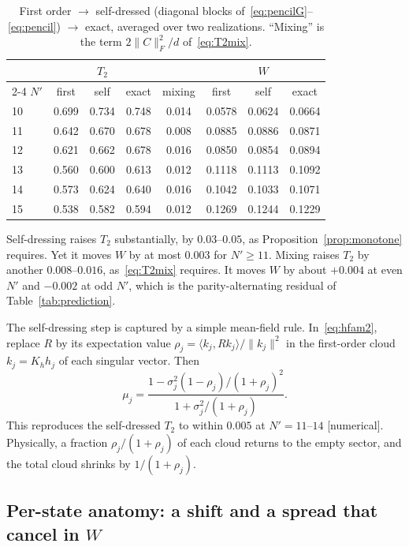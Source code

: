 \documentclass[11pt]{article}
\newcommand{\Np}{N'}
\newcommand{\ip}[2]{\langle #1,#2\rangle}
\newcommand{\Kh}{K_h}
\newcommand{\tagbox}[2]{\textsf{\small\color{#1}[#2]}}
\newcommand{\NUM}{\tagbox{cnum}{numerical}}
\theoremstyle{plain}
\theoremstyle{remark}
\numberwithin{equation}{section}
\begin{document}
\begin{table}[ht]
\centering\small
\caption{First order $\to$ self-dressed (diagonal blocks of~\eqref{eq:pencilG}--\eqref{eq:pencil}) $\to$ exact, averaged over two
realizations. ``Mixing'' is the term $2\|C\|_F^2/d$ of~\eqref{eq:T2mix}.}
\label{tab:blocks}
\begin{tabular}{lccccccc}\toprule
& \multicolumn{3}{c}{$T_2$} & & \multicolumn{3}{c}{$W$}\\\cmidrule{2-4}\cmidrule{6-8}
$\Np$ & first & self & exact & mixing & first & self & exact\\\midrule
10 & 0.699 & 0.734 & 0.748 & 0.014 & 0.0578 & 0.0624 & 0.0664\\
11 & 0.642 & 0.670 & 0.678 & 0.008 & 0.0885 & 0.0886 & 0.0871\\
12 & 0.621 & 0.662 & 0.678 & 0.016 & 0.0850 & 0.0854 & 0.0894\\
13 & 0.560 & 0.600 & 0.613 & 0.012 & 0.1118 & 0.1113 & 0.1092\\
14 & 0.573 & 0.624 & 0.640 & 0.016 & 0.1042 & 0.1033 & 0.1071\\
15 & 0.538 & 0.582 & 0.594 & 0.012 & 0.1269 & 0.1244 & 0.1229\\\bottomrule
\end{tabular}
\end{table}

Self-dressing raises $T_2$ substantially, by $0.03$--$0.05$, as Proposition~\ref{prop:monotone} requires. Yet it moves $W$
by at most $0.003$ for $\Np\ge11$. Mixing raises $T_2$ by another $0.008$--$0.016$, as~\eqref{eq:T2mix} requires. It
moves $W$ by about $+0.004$ at even $\Np$ and $-0.002$ at odd $\Np$, which is the parity-alternating residual of
Table~\ref{tab:prediction}.

The self-dressing step is captured by a simple mean-field rule. In~\eqref{eq:hfam2}, replace $R$ by its expectation
value $\rho_j=\ip{k_j}{Rk_j}/\|k_j\|^2$ in the first-order cloud $k_j=\Kh h_j$ of each singular vector. Then
\begin{equation}\label{eq:meanfield}
\mu_j=\frac{1-\sigma_j^2(1-\rho_j)/(1+\rho_j)^2}{1+\sigma_j^2/(1+\rho_j)}.
\end{equation}
This reproduces the self-dressed $T_2$ to within $0.005$ at $\Np=11$--$14$ \NUM. Physically, a fraction
$\rho_j/(1+\rho_j)$ of each cloud returns to the empty sector, and the total cloud shrinks by $1/(1+\rho_j)$.

\subsection{Per-state anatomy: a shift and a spread that cancel in \texorpdfstring{$W$}{W}}
\end{document}
